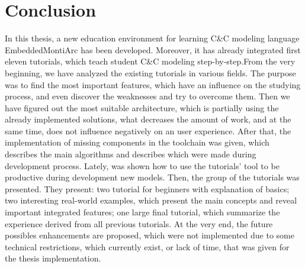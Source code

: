 \chapter{Conclusion}

In this thesis, a new education environment for learning C\&C modeling language EmbeddedMontiArc has been developed. Moreover, it has already integrated first eleven tutorials, which teach student C\&C modeling step-by-step.From the very beginning, we have analyzed the existing tutorials in various fields. The purpose was to find the most important features, which have an influence on the studying process, and even discover the weaknesses and try to overcome them. Then we have figured out the most suitable architecture, which is partially using the already implemented solutions, what decreases the amount of work, and at the same time, does not influence negatively on an user experience. After that, the implementation of missing components in the toolchain was given, which describes the main algorithms and describes which were made during development process. Lately, was shown how to use the tutorials' tool to be productive during development new models. Then, the group of the tutorials was presented. They present: two tutorial for beginners with explanation of basics; two interesting real-world examples, which present the main concepts and reveal important integrated features; one large final tutorial, which summarize the experience derived from all previous tutorials. At the very end, the future possibles enhancements are proposed, which were not implemented due to some technical restrictions, which currently exist, or lack of time, that was given for the thesis implementation.

\cleardoublepage
